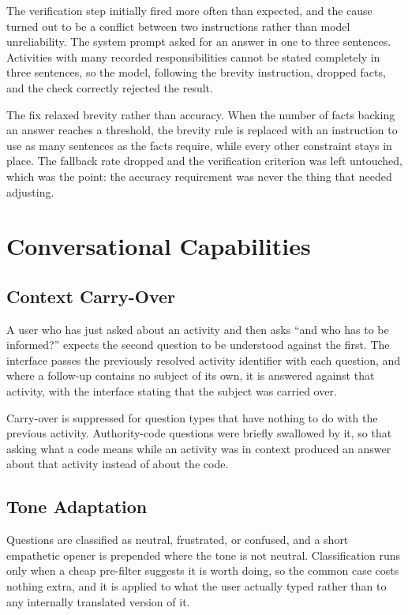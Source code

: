 The verification step initially fired more often than expected, and the cause turned out to be a conflict between two instructions rather than model unreliability. The system prompt asked for an answer in one to three sentences. Activities with many recorded responsibilities cannot be stated completely in three sentences, so the model, following the brevity instruction, dropped facts, and the check correctly rejected the result.

The fix relaxed brevity rather than accuracy. When the number of facts backing an answer reaches a threshold, the brevity rule is replaced with an instruction to use as many sentences as the facts require, while every other constraint stays in place. The fallback rate dropped and the verification criterion was left untouched, which was the point: the accuracy requirement was never the thing that needed adjusting.

\section{Conversational Capabilities}

\subsection{Context Carry-Over}

A user who has just asked about an activity and then asks ``and who has to be informed?'' expects the second question to be understood against the first. The interface passes the previously resolved activity identifier with each question, and where a follow-up contains no subject of its own, it is answered against that activity, with the interface stating that the subject was carried over.

Carry-over is suppressed for question types that have nothing to do with the previous activity. Authority-code questions were briefly swallowed by it, so that asking what a code means while an activity was in context produced an answer about that activity instead of about the code.

\subsection{Tone Adaptation}

Questions are classified as neutral, frustrated, or confused, and a short empathetic opener is prepended where the tone is not neutral. Classification runs only when a cheap pre-filter suggests it is worth doing, so the common case costs nothing extra, and it is applied to what the user actually typed rather than to any internally translated version of it.

